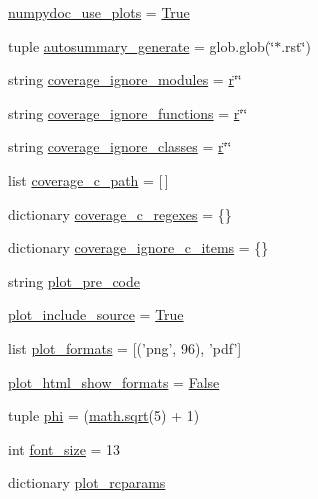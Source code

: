 \begin{DoxyCompactItemize}
\item 
\hyperlink{namespaceconf_a0b60d28b58b5b39a56f566734dec27bb}{numpydoc\+\_\+use\+\_\+plots} = \hyperlink{libqhull_8h_add3ca9eefe3b5b754426f51d3043e579}{True}
\item 
tuple \hyperlink{namespaceconf_a790a07d2f0a86a011425cc6070929a40}{autosummary\+\_\+generate} = glob.\+glob(\char`\"{}$\ast$.rst\char`\"{})
\item 
string \hyperlink{namespaceconf_ae217131f12bdd813b6a750a55e9ba96d}{coverage\+\_\+ignore\+\_\+modules} = \hyperlink{indexexpr_8h_ac434fd11cc2493608d8d91424d60c17e}{r}\char`\"{}\char`\"{}
\item 
string \hyperlink{namespaceconf_a0bb8fea05080545aa636fc04ede8f2c3}{coverage\+\_\+ignore\+\_\+functions} = \hyperlink{indexexpr_8h_ac434fd11cc2493608d8d91424d60c17e}{r}\char`\"{}\char`\"{}
\item 
string \hyperlink{namespaceconf_a0f16455586b86a7409d4448b17046361}{coverage\+\_\+ignore\+\_\+classes} = \hyperlink{indexexpr_8h_ac434fd11cc2493608d8d91424d60c17e}{r}\char`\"{}\char`\"{}
\item 
list \hyperlink{namespaceconf_a66c4e69b1e8fef3799e172716eab9f1f}{coverage\+\_\+c\+\_\+path} = \mbox{[}$\,$\mbox{]}
\item 
dictionary \hyperlink{namespaceconf_ac5da9552acb99ae9eee8fe6ed27c726b}{coverage\+\_\+c\+\_\+regexes} = \{\}
\item 
dictionary \hyperlink{namespaceconf_a36727259bb25073f8a8e6a00f674c583}{coverage\+\_\+ignore\+\_\+c\+\_\+items} = \{\}
\item 
string \hyperlink{namespaceconf_a7951284e1e80d61ad717b9345f2b9c6f}{plot\+\_\+pre\+\_\+code}
\item 
\hyperlink{namespaceconf_a5e2e05a50752b8f166612fe843188c5d}{plot\+\_\+include\+\_\+source} = \hyperlink{libqhull_8h_add3ca9eefe3b5b754426f51d3043e579}{True}
\item 
list \hyperlink{namespaceconf_adbde6e4ba4ea4a0e49f91458929d4ec1}{plot\+\_\+formats} = \mbox{[}('png', 96), 'pdf'\mbox{]}
\item 
\hyperlink{namespaceconf_ae9f2c59909a69f8f7f48c341909d3347}{plot\+\_\+html\+\_\+show\+\_\+formats} = \hyperlink{libqhull_8h_a306ebd41c0cd1303b1372c6153f0caf8}{False}
\item 
tuple \hyperlink{namespaceconf_a4c4f89ad309f3e6b631369d9564d07e0}{phi} = (\hyperlink{vecuops_8cc_ac9f82fdb8cd289615247f897852ee5f2}{math.\+sqrt}(5) + 1)
\item 
int \hyperlink{namespaceconf_a8513964f1baeeec66f3f3df07d05759c}{font\+\_\+size} = 13
\item 
dictionary \hyperlink{namespaceconf_af2b068506b37ff5b4bed655c96c5ffa5}{plot\+\_\+rcparams}
\end{DoxyCompactItemize}


